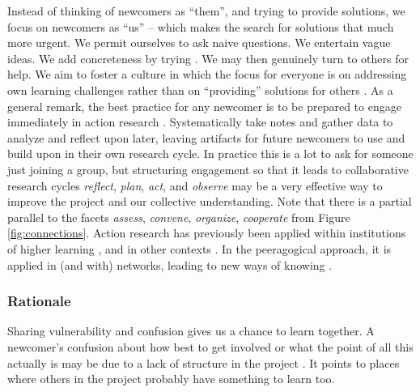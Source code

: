 Instead of thinking of newcomers as ``them'', and trying to provide
solutions, we focus on newcomers as ``us'' -- which makes the search
for solutions that much more urgent.  We permit ourselves to ask naive
questions.  We entertain vague ideas.  We add concreteness by trying
.  We may then genuinely turn to
others for help.
We aim to foster a culture in which the focus for everyone is on
addressing own learning challenges rather than on ``providing''
solutions for others \cite{boud2005peer}.
%
As a general remark, the best practice for any newcomer is to be
prepared to engage immediately in action research
\cite{lewin1946action}.  Systematically take notes and gather data to
analyze and reflect upon later, leaving artifacts for future newcomers
to use and build upon in their own research cycle.  In practice this is a
lot to ask for someone just joining a group, but structuring
engagement so that it leads to collaborative research cycles
\emph{reflect}, \emph{plan}, \emph{act}, and \emph{observe} may be a
very effective way to improve the project and our collective
understanding.
Note that there is a partial parallel to the facets \emph{assess},
\emph{convene}, \emph{organize}, \emph{cooperate} from Figure
\ref{fig:connections}.  Action research has previously been applied
within institutions of higher learning \cite{action-research-OU}, and
in other contexts \cite{trist1951some,bergold2012participatory}.
%
In the peeragogical approach, it is applied in (and with) networks,
leading to new ways of knowing \cite{gilbert2012being,wagner2008new}.

%
\subsubsection*{Rationale} 
%
Sharing vulnerability and confusion gives us a chance to learn
together.  A newcomer's confusion about how best to get involved or
what the point of all this actually is may be due to a lack of
structure in the project .  It points to places
where others in the project probably have something to learn too.
%

